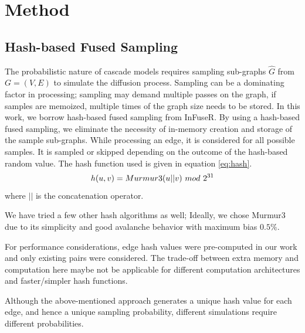\documentclass[10pt,journal,compsoc]{IEEEtran}
\begin{document}
\section{Method}\label{sec:method}

\subsection{Hash-based Fused Sampling}
The probabilistic nature of cascade models requires sampling sub-graphs $\hat{G}$ from $G = (V, E)$ to simulate the diffusion process.  Sampling can be a dominating factor in processing; sampling may demand multiple passes on the graph, if samples are memoized, multiple times of the graph size needs to be stored.
In this work, we borrow hash-based fused sampling from {\sc InFuseR}\cite{infuser}. By using a hash-based fused sampling, we eliminate the necessity of in-memory creation and storage of the sample sub-graphs.
While processing an edge, it is considered for all possible samples.
It is sampled or skipped depending on the outcome of the hash-based random value. The hash function used is given in equation \ref{eq:hash}.
\begin{equation}
    \label{eq:hash}
    h(u,v) = \mbox{{\sc Murmur3}}(u||v)~mod~2^{31}  
\end{equation}
where $||$ is the concatenation operator. 

We have tried a few other hash algorithms as well; Ideally, we chose {{\sc Murmur3}} due to its simplicity and good avalanche behavior with maximum bias $0.5 \% $\cite{MurmurHash3Performance}.

For performance considerations, edge hash values were pre-computed in our work and only existing pairs were considered. The trade-off between extra memory and computation here maybe not be applicable for different computation architectures and faster/simpler hash functions.

Although the above-mentioned approach generates a unique hash value for each edge, and hence a unique sampling probability, different simulations require different probabilities.
\end{document}
